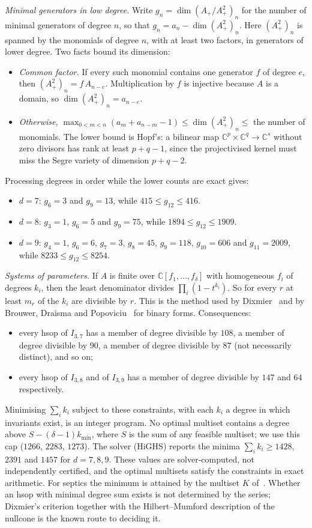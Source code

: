 \documentclass[11pt]{amsart}
\theoremstyle{definition}
\theoremstyle{remark}
\newcommand{\C}{\mathbb{C}}
\begin{document}
\emph{Minimal generators in low degree.} Write $g_n=\dim(A_+/A_+^2)_n$ for the number of minimal generators of degree $n$, so that $g_n=a_n-\dim(A_+^2)_n$. Here $(A_+^2)_n$ is spanned by the monomials of degree $n$, with at least two factors, in generators of lower degree. Two facts bound its dimension:
\begin{itemize}
\item \emph{Common factor.} If every such monomial contains one generator $f$ of degree $e$, then $(A_+^2)_n=f\,A_{n-e}$. Multiplication by $f$ is injective because $A$ is a domain, so $\dim(A_+^2)_n=a_{n-e}$.
\item \emph{Otherwise,} $\max_{0<m<n}(a_m+a_{n-m}-1)\le\dim(A_+^2)_n\le$ the number of monomials. The lower bound is Hopf's: a bilinear map $\C^p\times\C^q\to\C^s$ without zero divisors has rank at least $p+q-1$, since the projectivised kernel must miss the Segre variety of dimension $p+q-2$.
\end{itemize}
Processing degrees in order while the lower counts are exact gives:
\begin{itemize}
\item $d=7$: $g_6=3$ and $g_9=13$, while $415\le g_{12}\le416$.
\item $d=8$: $g_3=1$, $g_6=5$ and $g_9=75$, while $1894\le g_{12}\le1909$.
\item $d=9$: $g_4=1$, $g_6=6$, $g_7=3$, $g_8=45$, $g_9=118$, $g_{10}=606$ and $g_{11}=2009$, while $8233\le g_{12}\le8254$.
\end{itemize}

\emph{Systems of parameters.} If $A$ is finite over $\C[f_1,\dots,f_\delta]$ with homogeneous $f_i$ of degrees $k_i$, then the least denominator divides $\prod_i(1-t^{k_i})$. So for every $r$ at least $m_r$ of the $k_i$ are divisible by $r$. This is the method used by Dixmier~\cite{Dix83} and by Brouwer, Draisma and Popoviciu~\cite{BDP15} for binary forms. Consequences:
\begin{itemize}
\item every hsop of $I_{3,7}$ has a member of degree divisible by $108$, a member of degree divisible by $90$, a member of degree divisible by $87$ (not necessarily distinct), and so on;
\item every hsop of $I_{3,8}$ and of $I_{3,9}$ has a member of degree divisible by $147$ and $64$ respectively.
\end{itemize}
Minimising $\sum_ik_i$ subject to these constraints, with each $k_i$ a degree in which invariants exist, is an integer program. No optimal multiset contains a degree above $S-(\delta-1)k_{\min}$, where $S$ is the sum of any feasible multiset; we use this cap ($1266$, $2283$, $1273$). The solver (HiGHS) reports the minima $\sum_ik_i\ge1428$, $2391$ and $1457$ for $d=7,8,9$. These values are solver-computed, not independently certified, and the optimal multisets satisfy the constraints in exact arithmetic. For septics the minimum is attained by the multiset $K$ of~\cite[Thm.~2]{V01}. Whether an hsop with minimal degree sum exists is not determined by the series; Dixmier's criterion together with the Hilbert--Mumford description of the nullcone is the known route to deciding it.
\end{document}
